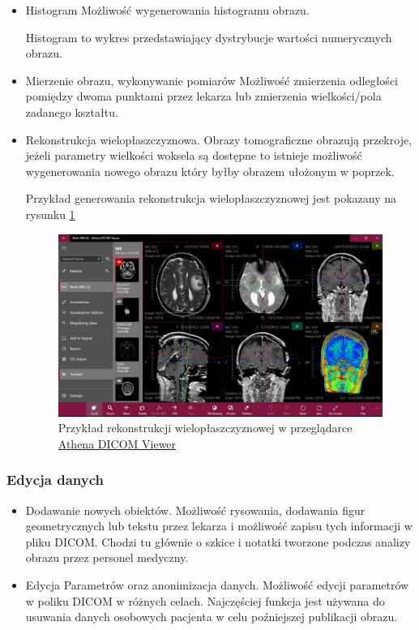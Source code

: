 \begin{itemize}
      \item Histogram
            Możliwość wygenerowania histogramu obrazu.

            Histogram to wykres przedstawiający dystrybucje wartości numerycznych obrazu.

      \item Mierzenie obrazu, wykonywanie pomiarów
            Możliwość zmierzenia odległości pomiędzy dwoma punktami przez lekarza lub zmierzenia wielkości/pola zadanego kształtu.

      \item Rekonstrukcja wielopłaszczyznowa.
            Obrazy tomograficzne obrazują przekroje, jeżeli parametry wielkości woksela są dostępne to istnieje możliwość wygenerowania nowego obrazu który byłby obrazem ułożonym w poprzek.

            Przykład generowania rekonstrukcja wielopłaszczyznowej jest pokazany na rysunku \ref{fig:dicomviewer003}

            \begin{figure}[!htbp]
                  \centering
                  \includegraphics[width=\textwidth]{img/dicom-viewer-003.jpeg}
                  \caption{Przykład rekonstrukcji wielopłaszczyznowej w przeglądarce \href{https://athenadicomviewer.com/}{Athena DICOM Viewer}}
                  \label{fig:dicomviewer003}
            \end{figure}
\end{itemize}

\subsubsection{Edycja danych}

\begin{itemize}
      \item Dodawanie nowych obiektów.
            Możliwość rysowania, dodawania figur geometrycznych lub tekstu przez lekarza i możliwość zapisu tych informacji w pliku DICOM.
            Chodzi tu głównie o szkice i notatki tworzone podczas analizy obrazu przez personel medyczny.

      \item Edycja Parametrów oraz anonimizacja danych.
            Możliwość edycji parametrów w poliku DICOM w różnych celach.
            Najczęściej funkcja jest używana do usuwania danych osobowych pacjenta w celu poźniejszej publikacji obrazu.

\end{itemize}